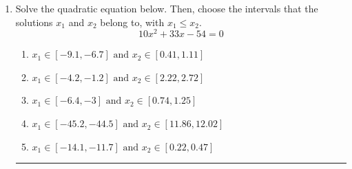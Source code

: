 \documentclass[14pt]{extbook}
\newcommand{\litem}[1]{\item#1\hspace*{-1cm}\rule{\textwidth}{0.4pt}}
\begin{document}
\begin{enumerate}
{\begin{enumerate}[label=\Alph*.]
\end{enumerate} }
\litem{
Solve the quadratic equation below. Then, choose the intervals that the solutions $x_1$ and $x_2$ belong to, with $x_1 \leq x_2$.\[ 10x^{2} +33 x -54 = 0 \]\begin{enumerate}[label=\Alph*.]
\item \( x_1 \in [-9.1, -6.7] \text{ and } x_2 \in [0.41, 1.11] \)
\item \( x_1 \in [-4.2, -1.2] \text{ and } x_2 \in [2.22, 2.72] \)
\item \( x_1 \in [-6.4, -3] \text{ and } x_2 \in [0.74, 1.25] \)
\item \( x_1 \in [-45.2, -44.5] \text{ and } x_2 \in [11.86, 12.02] \)
\item \( x_1 \in [-14.1, -11.7] \text{ and } x_2 \in [0.22, 0.47] \)

\end{enumerate} }
\end{enumerate}
\end{document}
